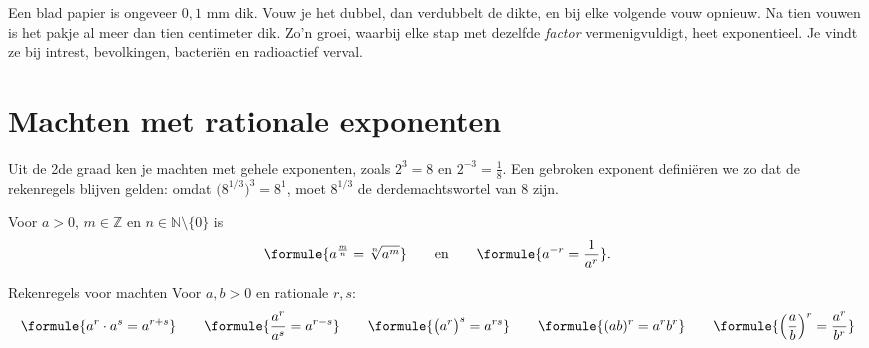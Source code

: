 %



Een blad papier is ongeveer $0{,}1$ mm dik. Vouw je het dubbel, dan verdubbelt de dikte, en bij elke volgende vouw opnieuw. Na tien vouwen is het pakje al meer dan tien centimeter dik. Zo'n groei, waarbij elke stap met dezelfde \textit{factor} vermenigvuldigt, heet exponentieel. Je vindt ze bij intrest, bevolkingen, bacteriën en radioactief verval.

\begin{oefeningen}[Start]

\end{oefeningen}

\section{Machten met rationale exponenten}

Uit de 2de graad ken je machten met gehele exponenten, zoals $2^3 = 8$ en $2^{-3} = \frac18$. Een gebroken exponent definiëren we zo dat de rekenregels blijven gelden: omdat $\bigl(8^{1/3}\bigr)^3 = 8^1$, moet $8^{1/3}$ de derdemachtswortel van $8$ zijn.

\begin{theorie}
Voor $a > 0$, $m \in \mathbb{Z}$ en $n \in \mathbb{N} \setminus \{0\}$ is
\[\formule{a^{\frac{m}{n}} = \sqrt[n]{a^m}} \qquad \text{en} \qquad \formule{a^{-r} = \frac{1}{a^r}}.\]
\begin{stelling}{Rekenregels voor machten}
Voor $a, b > 0$ en rationale $r, s$:
\[\formule{a^r \cdot a^s = a^{r + s}} \qquad \formule{\frac{a^r}{a^s} = a^{r - s}} \qquad \formule{\bigl(a^r\bigr)^s = a^{rs}} \qquad \formule{(ab)^r = a^r b^r} \qquad \formule{\Bigl(\frac{a}{b}\Bigr)^r = \frac{a^r}{b^r}}\]
\end{stelling}
\end{theorie}

